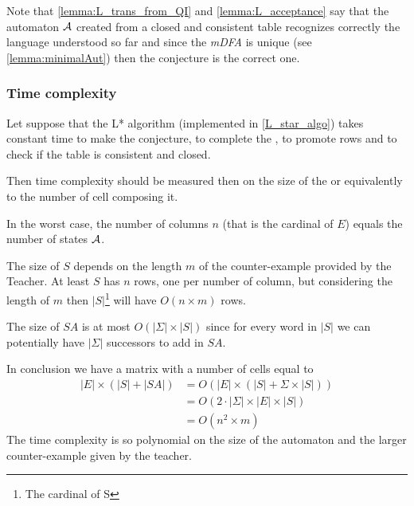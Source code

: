 \begin{remark}
  Note that \cref{lemma:L_trans_from_QI} and \cref{lemma:L_acceptance} say that the automaton $\mathcal{A}$ created from a closed and consistent table recognizes correctly the language understood so far and since the \textit{mDFA} is unique (see \cref{lemma:minimalAut}) then the conjecture is the correct one.
\end{remark}

\subsubsection{Time complexity}
Let suppose that the L* algorithm (implemented in \cref{L_star_algo}) takes constant time to make the conjecture, to complete the \OT, to promote rows and to check if the table is consistent and closed.

Then time complexity should be measured then on the size of the \OT or equivalently to the number of cell composing it.

In the worst case, the number of columns $n$ (that is the cardinal of $E$) equals the number of states $\mathcal{A}$.

The size of $S$ depends on the length $m$ of the counter-example provided by the Teacher. At least $S$ has $n$ rows, one per number of column, but considering the length of $m$ then $|S|$\footnote{The cardinal of S} will have $O(n \times m)$ rows.

The size of $SA$ is at most $O(|\Sigma| \times |S|)$ since for every word in $|S|$ we can potentially have $|\Sigma|$ successors to add in $SA$.

In conclusion we have a matrix with a number of cells equal to
\begin{align*}
  |E|\times(|S| + |SA|) & = O(|E|\times(|S| + \Sigma \times |S|))     \\
                        & = O(2 \cdot |\Sigma| \times |E| \times |S|) \\
                        & = O(n^2 \times m)
\end{align*}
The time complexity is so polynomial on the size of the automaton and the larger counter-example given by the teacher.